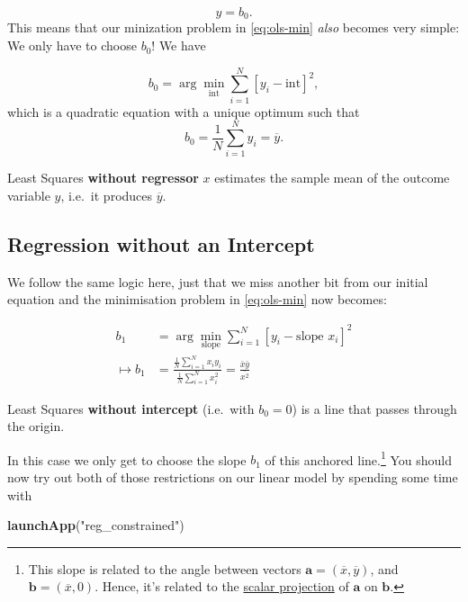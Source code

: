 \documentclass[]{book}
\newenvironment{Shaded}{\begin{snugshade}}{\end{snugshade}}
\newcommand{\KeywordTok}[1]{\textcolor[rgb]{0.13,0.29,0.53}{\textbf{#1}}}
\newcommand{\StringTok}[1]{\textcolor[rgb]{0.31,0.60,0.02}{#1}}
\newcommand{\NormalTok}[1]{#1}
\let\rmarkdownfootnote\footnote%
\def\footnote{\protect\rmarkdownfootnote}
\newenvironment{tip}{\begin{tcolorbox}[colback=green!5!white,colframe=green,title=\textbf{Tip:}]}{\end{tcolorbox}}
\theoremstyle{definition}
\theoremstyle{definition}
\theoremstyle{definition}
\theoremstyle{remark}
\begin{document}
\[
y = b_0. \label{eq:b0line}
\] This means that our minization problem in \eqref{eq:ols-min}
\emph{also} becomes very simple: We only have to choose \(b_0\)! We have

\[
b_0 = \arg\min_{\text{int}} \sum_{i=1}^N \left[y_i - \text{int}\right]^2,
\] which is a quadratic equation with a unique optimum such that \[
b_0 = \frac{1}{N} \sum_{i=1}^N y_i = \overline{y}.
\]

\begin{tip}
Least Squares \textbf{without regressor} \(x\) estimates the sample mean
of the outcome variable \(y\), i.e.~it produces \(\overline{y}\).
\end{tip}

\subsection{Regression without an
Intercept}\label{regression-without-an-intercept}

We follow the same logic here, just that we miss another bit from our
initial equation and the minimisation problem in \eqref{eq:ols-min} now
becomes:

\begin{align}
b_1 &= \arg\min_{\text{slope}} \sum_{i=1}^N \left[y_i - \text{slope } x_i \right]^2\\
\mapsto b_1 &= \frac{\frac{1}{N}\sum_{i=1}^N x_i y_i}{\frac{1}{N}\sum_{i=1}^N x_i^2} = \frac{\bar{x} \bar{y}}{\overline{x^2}} \label{eq:b1line}
\end{align}

\begin{tip}
Least Squares \textbf{without intercept} (i.e.~with \(b_0=0\)) is a line
that passes through the origin.
\end{tip}

In this case we only get to choose the slope \(b_1\) of this anchored
line.\footnote{This slope is related to the angle between vectors
  \(\mathbf{a} = (\overline{x},\overline{y})\), and
  \(\mathbf{b} = (\overline{x},0)\). Hence, it's related to the
  \href{https://en.wikipedia.org/wiki/Scalar_projection}{scalar
  projection} of \(\mathbf{a}\) on \(\mathbf{b}\).} You should now try
out both of those restrictions on our linear model by spending some time
with

\begin{Shaded}
\begin{Highlighting}[]
\KeywordTok{launchApp}\NormalTok{(}\StringTok{"reg_constrained"}\NormalTok{)}
\end{Highlighting}
\end{Shaded}
\end{document}
